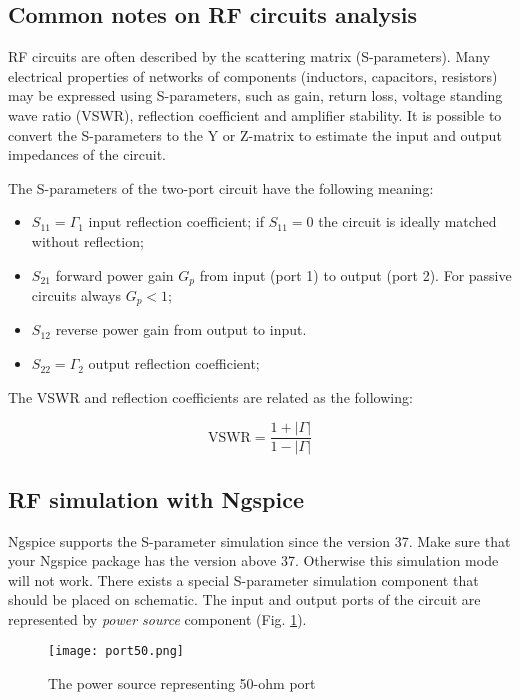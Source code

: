 \subsection{Common notes on RF circuits analysis}

RF circuits are often described by the scattering matrix (S-parameters). Many electrical properties of networks of components (inductors, capacitors, resistors) may be expressed using S-parameters, such as gain, return loss, voltage standing wave ratio (VSWR), reflection coefficient and amplifier stability. It is possible to convert the S-parameters to the Y or Z-matrix to estimate the input and output impedances of the circuit.

The S-parameters of the two-port circuit have the following meaning:

\begin{itemize}
 \item $S_{11}=\Gamma_1$ input reflection coefficient; if $S_{11}=0$ the circuit is ideally matched without reflection;
 \item $S_{21}$ forward power gain $G_p$ from input (port 1) to output (port 2). For passive circuits always $G_p<1$;
 \item $S_{12}$ reverse power gain from output to input.
 \item $S_{22}=\Gamma_2$ output reflection coefficient;
\end{itemize}

The VSWR and reflection coefficients are related as the following:

\begin{equation}
 \mathrm{VSWR} = \frac{1+|\Gamma|}{1-|\Gamma|}
\end{equation}

\subsection{RF simulation with Ngspice}

Ngspice supports the S-parameter simulation since the version 37. Make sure that your Ngspice package has the version above 37. Otherwise this simulation mode will not work. There exists a special S-parameter simulation component that should be placed on schematic. The input and output ports of the circuit are represented by \emph{power source} component (Fig. \ref{fig:port50}).

    \begin{figure}[!ht]
    \begin{center}
        \texttt{[image: port50.png]}
    \end{center}
    \caption{The power source representing 50-ohm port} \label{fig:port50}
    \end{figure}

